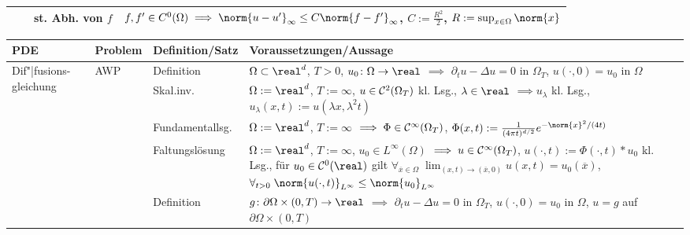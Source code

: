 \begin{landscape}
\begin{tabular}{p{20mm}p{20mm}p{30mm}p{169mm}}
        &&st. Abh. von $f$&
        $f, f' \in C^0(\Omega)
        \implies \norm{u - u'}_\infty \le C \norm{f - f'}_\infty$, $C := \frac{R^2}{2}$,
        $R := \sup_{x \in \Omega} \norm{x}$\\

        \bottomrule
    \end{tabular}

    \pagebreak

    \begin{tabular}{p{20mm}p{20mm}p{30mm}p{169mm}}
        \toprule

        \textbf{PDE}&
        \textbf{Problem}&
        \textbf{Definition/Satz}&
        \textbf{Voraussetzungen/Aussage}\\

        \midrule

        \multirow{11}{20mm}{Dif"|fusions-gleichung}&
        \multirow{5}{20mm}{AWP}&
        Definition&
        $\Omega \subset \real^d$, $T > 0$, $u_0\colon \Omega \to \real$
        $\implies$
        $\partial_t u - \Delta u = 0$ in $\Omega_T$,
        $u(\cdot, 0) = u_0$ in $\Omega$\\

        &&Skal.inv.&
        $\Omega := \real^d$, $T := \infty$, $u \in \mathcal{C}^2(\Omega_T)$ kl. Lsg., $\lambda \in \real$
        $\implies u_\lambda$ kl. Lsg., $u_\lambda(x, t) := u(\lambda x, \lambda^2 t)$\\

        &&Fundamentallsg.&
        $\Omega := \real^d$, $T := \infty$
        $\implies \Phi \in \mathcal{C}^\infty(\Omega_T)$,
        $\Phi(x, t) := \frac{1}{(4\pi t)^{d/2}} e^{-\norm{x}^2/(4t)}$\\

        &&Faltungslösung&
        $\Omega := \real^d$, $T := \infty$, $u_0 \in L^\infty(\Omega)$
        $\implies u \in \mathcal{C}^\infty(\Omega_T)$,
        $u(\cdot, t) := \Phi(\cdot, t) \ast u_0$ kl. Lsg.,\newline
        für $u_0 \in \C^0(\real)$ gilt
        $\forall_{\overline{x} \in \Omega}\;
        \lim_{(x, t) \to (\overline{x}, 0)} u(x, t) = u_0(\overline{x})$,
        $\forall_{t > 0}\; \norm{u(\cdot, t)}_{L^\infty} \le \norm{u_0}_{L^\infty}$\\

        \cmidrule{2-4}

        &\multirow{2}{20mm}{ARWP}&
        Definition&
        $g\colon \partial\Omega \times (0, T) \to \real$
        $\implies$
        $\partial_t u - \Delta u = 0$ in $\Omega_T$,
        $u(\cdot, 0) = u_0$ in $\Omega$,
        $u = g$ auf $\partial\Omega \times (0, T)$\\


\end{tabular}
\end{landscape}
